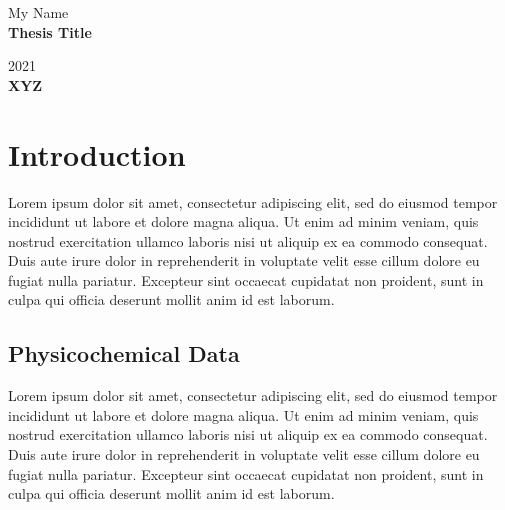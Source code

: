 \documentclass[a4paper,12pt]{report}
\begin{document}
\onehalfspacing
{}
\setlength\parindent{0pt}

\begin{titlepage}
   \begin{center}
       \vspace*{1cm}
        
        My Name\\
        
        \vspace{1cm}
       {\large \textbf{Thesis Title}}
       \vspace{1cm}
       
        2021\\
       \vfill
        {\bf \hfill XYZ}
   \end{center}
\end{titlepage}
\newpage

\tableofcontents\thispagestyle{fancy}
\newpage

\listoffigures\thispagestyle{fancy}
\newpage

\listoftables\thispagestyle{fancy}
\newpage

\section[Introduction]{Introduction}
Lorem ipsum dolor sit amet, consectetur adipiscing elit, sed do eiusmod tempor incididunt ut labore et dolore magna aliqua. Ut enim ad minim veniam, quis nostrud exercitation ullamco laboris nisi ut aliquip ex ea commodo consequat. Duis aute irure dolor in reprehenderit in voluptate velit esse cillum dolore eu fugiat nulla pariatur. Excepteur sint occaecat cupidatat non proident, sunt in culpa qui officia deserunt mollit anim id est laborum.
\subsection{Physicochemical Data}
Lorem ipsum dolor sit amet, consectetur adipiscing elit, sed do eiusmod tempor incididunt ut labore et dolore magna aliqua. Ut enim ad minim veniam, quis nostrud exercitation ullamco laboris nisi ut aliquip ex ea commodo consequat. Duis aute irure dolor in reprehenderit in voluptate velit esse cillum dolore eu fugiat nulla pariatur. Excepteur sint occaecat cupidatat non proident, sunt in culpa qui officia deserunt mollit anim id est laborum.
\end{document}
